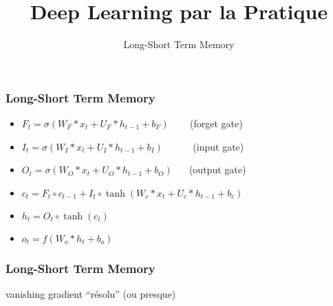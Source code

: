 \documentclass{formation}
\title{Deep Learning par la Pratique}
\subtitle{Long-Short Term Memory}
\begin{document}
\maketitle

\begin{frame}
  \frametitle{Long-Short Term Memory}
  \begin{itemize}
  \item $F_{t}=\sigma (W_{F}*x_{t}+U_{F}*h_{t-1}+b_{F})\;\;\;\;\;\;\,$ (forget gate)
  \item $I_{t} =\sigma (W_{I}*x_{t}+U_{I}*h_{t-1}+b_{I})\;\;\;\;\;\;\;\;\;\;$ (input gate)
  \item $O_{t} =\sigma (W_{O}*x_{t}+U_{O}*h_{t-1}+b_{O})\;\;\;\;\;$ (output gate)
  \item $c_{t} =F_{t}\circ c_{t-1}+I_{t}\circ \tanh(W_{c}*x_{t}+U_{c}*h_{t-1}+b_{c})$
  \item $h_{t} =O_{t}\circ \tanh(c_{t})$
  \item $o_{t} =f(W_{o}*h_{t}+b_{o})$
  \end{itemize}
\end{frame}

\begin{frame}
  \frametitle{Long-Short Term Memory}
  vanishing gradient ``résolu'' (ou presque)
\end{frame}
\end{document}
